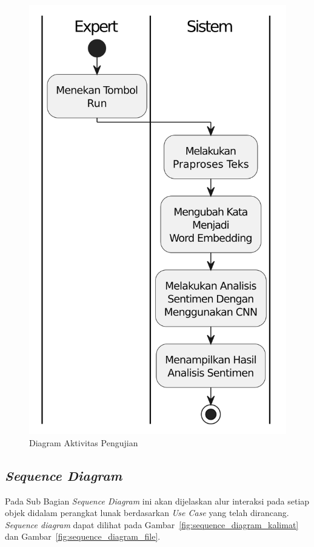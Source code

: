 \begin{figure}[H]
  \centering
  \includegraphics[scale=0.7]{assets/activity_diagram_test.png}
  \caption{Diagram Aktivitas Pengujian}
  \label{fig:activity_diagram_kalimat}
\end{figure}

\subsection{\emph{Sequence Diagram}}
Pada Sub Bagian \emph{Sequence Diagram} ini akan dijelaskan alur interaksi pada setiap objek didalam
perangkat lunak berdasarkan \emph{Use Case} yang telah dirancang. \emph{Sequence diagram} dapat dilihat
pada Gambar~\ref{fig:sequence_diagram_kalimat} dan Gambar~\ref{fig:sequence_diagram_file}.


